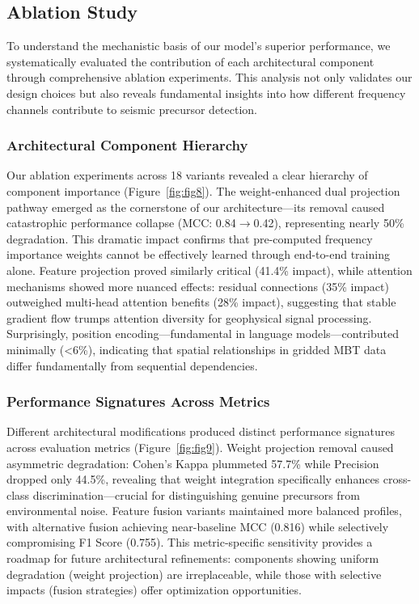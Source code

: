 \documentclass[preprint,review,12pt,authoryear]{elsarticle}
\begin{document}
\subsection{Ablation Study}
To understand the mechanistic basis of our model's superior performance, we systematically evaluated the contribution of each architectural component through comprehensive ablation experiments. This analysis not only validates our design choices but also reveals fundamental insights into how different frequency channels contribute to seismic precursor detection.

\subsubsection{Architectural Component Hierarchy}
Our ablation experiments across 18 variants revealed a clear hierarchy of component importance (Figure~\ref{fig:fig8}). The weight-enhanced dual projection pathway emerged as the cornerstone of our architecture---its removal caused catastrophic performance collapse (MCC: 0.84$\rightarrow$0.42), representing nearly 50\% degradation. This dramatic impact confirms that pre-computed frequency importance weights cannot be effectively learned through end-to-end training alone. Feature projection proved similarly critical (41.4\% impact), while attention mechanisms showed more nuanced effects: residual connections (35\% impact) outweighed multi-head attention benefits (28\% impact), suggesting that stable gradient flow trumps attention diversity for geophysical signal processing. Surprisingly, position encoding---fundamental in language models---contributed minimally (<6\%), indicating that spatial relationships in gridded MBT data differ fundamentally from sequential dependencies.

\subsubsection{Performance Signatures Across Metrics}
Different architectural modifications produced distinct performance signatures across evaluation metrics (Figure~\ref{fig:fig9}). Weight projection removal caused asymmetric degradation: Cohen's Kappa plummeted 57.7\% while Precision dropped only 44.5\%, revealing that weight integration specifically enhances cross-class discrimination---crucial for distinguishing genuine precursors from environmental noise. Feature fusion variants maintained more balanced profiles, with alternative fusion achieving near-baseline MCC (0.816) while selectively compromising F1 Score (0.755). This metric-specific sensitivity provides a roadmap for future architectural refinements: components showing uniform degradation (weight projection) are irreplaceable, while those with selective impacts (fusion strategies) offer optimization opportunities.
\end{document}
